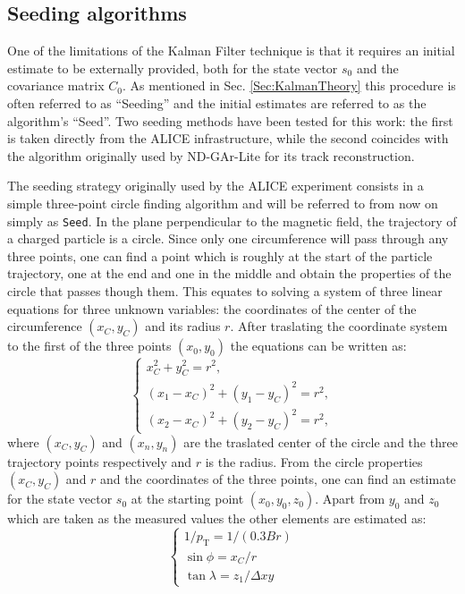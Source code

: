 \subsection{Seeding algorithms}
\label{Sec:SeedingLite}
One of the limitations of the Kalman Filter technique is that it requires an initial estimate to be externally provided, both for the state vector $s_0$ and the covariance matrix $C_0$. As mentioned in
Sec. \ref{Sec:KalmanTheory} this procedure is often referred to as \enquote{Seeding} and the initial estimates are referred to as the algorithm’s \enquote{Seed}. Two seeding methods have been tested for this work: the first is taken directly from the ALICE infrastructure, while the second coincides with the algorithm originally used by ND-GAr-Lite for its track reconstruction.

The seeding strategy originally used by the ALICE experiment consists in a simple three-point circle finding algorithm and will be referred to from now on simply as \texttt{Seed}. In the plane perpendicular to the magnetic field, the trajectory of a charged particle is a circle. Since only one circumference will pass through any three points, one can find a point which is roughly at the start of the particle trajectory, one at the end and one in the middle and obtain the properties of the circle that passes though them. This equates to solving a system of three linear equations for three unknown variables: the coordinates of the center of the circumference $(x_C,y_C)$ and its radius $r$. After traslating the coordinate system to the first of the three points $(x_0,y_0)$ the equations can be written as:
\begin{equation}
\begin{cases} 
x_C^2+y_C^2 = r^2, \\
(x_1-x_C)^2+(y_1-y_C)^2=r^2, \\
(x_2-x_C)^2+(y_2-y_C)^2=r^2,
\end{cases}
\end{equation}
where $(x_C,y_C)$ and $(x_n,y_n)$ are the traslated center of the circle and the three trajectory points respectively and $r$ is the radius. From the circle properties $(x_C,y_C)$ and $r$ and the coordinates of the three points, one can find an estimate for the state vector $s_0$ at the starting point $(x_0,y_0,z_0)$. Apart from $y_0$ and $z_0$ which are taken as the measured values the other elements are estimated as:
\begin{equation}\label{eq:SeedPar}
    \begin{cases}
        1/p_\textrm{T} = 1/(0.3  B  r )\\
        \sin \phi = x_C/r \\
        \tan \lambda = z_1 / \Delta xy
    \end{cases}
\end{equation}
